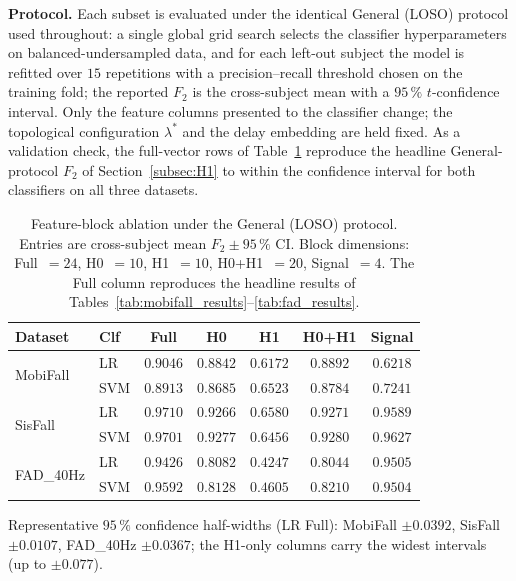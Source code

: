 \documentclass[onluarkali,ingilizce,yukseklisans,karton,LisansustuEgitim]{itutez}
\providecommand{\1}{\mathbf{1}}
\begin{document}
\textbf{Protocol.}  Each subset is evaluated under the identical General (LOSO)
protocol used throughout: a single global grid search selects the classifier
hyperparameters on balanced-undersampled data, and for each left-out subject the model
is refitted over $15$ repetitions with a precision--recall threshold chosen on the
training fold; the reported $F_2$ is the cross-subject mean with a $95\,\%$ $t$-confidence
interval.  Only the feature columns presented to the classifier change; the topological
configuration $\lambda^*$ and the delay embedding are held fixed.  As a validation
check, the full-vector rows of Table~\ref{tab:ablation_blocks} reproduce the headline
General-protocol $F_2$ of Section~\ref{subsec:H1} to within the confidence interval for
both classifiers on all three datasets.

\begin{table}[h!]
\centering
\caption{Feature-block ablation under the General (LOSO) protocol.  Entries are
  cross-subject mean $F_2 \pm 95\,\%$ CI.  Block dimensions: Full~$=24$, H0~$=10$,
  H1~$=10$, H0+H1~$=20$, Signal~$=4$.  The Full column reproduces the headline results
  of Tables~\ref{tab:mobifall_results}--\ref{tab:fad_results}.}
\label{tab:ablation_blocks}
\setlength{\tabcolsep}{3.5pt}\footnotesize
\begin{tabular}{llccccc}
\toprule
\textbf{Dataset} & \textbf{Clf}
  & \textbf{Full} & \textbf{H0} & \textbf{H1} & \textbf{H0+H1} & \textbf{Signal} \\
\midrule
\multirow{2}{*}{MobiFall}
 & LR  & $\mathbf{0.9046}$ & $0.8842$ & $0.6172$ & $0.8892$ & $0.6218$ \\
 & SVM & $\mathbf{0.8913}$ & $0.8685$ & $0.6523$ & $0.8784$ & $0.7241$ \\
\midrule
\multirow{2}{*}{SisFall}
 & LR  & $\mathbf{0.9710}$ & $0.9266$ & $0.6580$ & $0.9271$ & $0.9589$ \\
 & SVM & $\mathbf{0.9701}$ & $0.9277$ & $0.6456$ & $0.9280$ & $0.9627$ \\
\midrule
\multirow{2}{*}{FAD\_40Hz}
 & LR  & $\mathbf{0.9426}$ & $0.8082$ & $0.4247$ & $0.8044$ & $0.9505$ \\
 & SVM & $\mathbf{0.9592}$ & $0.8128$ & $0.4605$ & $0.8210$ & $0.9504$ \\
\bottomrule
\end{tabular}

\vspace{2pt}
{\footnotesize Representative $95\,\%$ confidence half-widths (LR Full):
MobiFall $\pm0.0392$, SisFall $\pm0.0107$, FAD\_40Hz $\pm0.0367$; the H1-only columns
carry the widest intervals (up to $\pm0.077$).}
\end{table}
\end{document}
